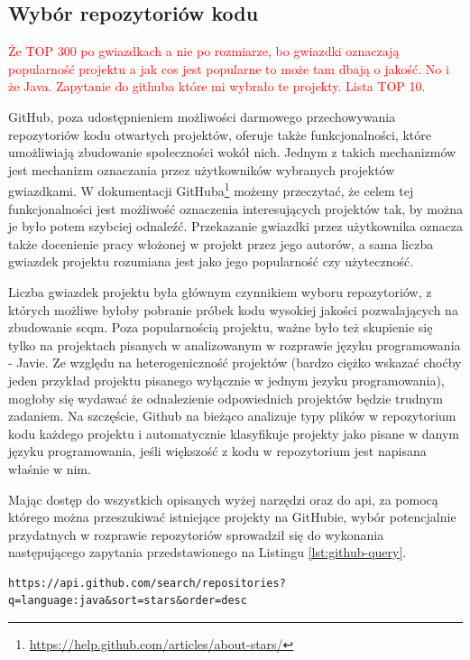 \documentclass[12pt]{report}
\begin{document}
\subsection{Wybór repozytoriów kodu}
\label{sec:impl:wybor-github}
\textcolor{red}{Że TOP 300 po gwiazdkach a nie po rozmiarze, bo gwiazdki oznaczają popularność projektu a jak cos jest popularne to może tam dbają o jakość. No i że Java. Zapytanie do githuba które mi wybrało te projekty. Lista TOP 10.}

GitHub, poza udostępnieniem możliwości darmowego przechowywania repozytoriów kodu otwartych projektów, oferuje także funkcjonalności, które umożliwiają zbudowanie społeczności wokół nich. Jednym z takich mechanizmów jest mechanizm oznaczania przez użytkowników wybranych projektów gwiazdkami. W dokumentacji GitHuba\footnote{\url{https://help.github.com/articles/about-stars/}} możemy przeczytać, że celem tej funkcjonalności jest możliwość oznaczenia interesujących projektów tak, by można je było potem szybciej odnaleźć. Przekazanie gwiazdki przez użytkownika oznacza także docenienie pracy włożonej w projekt przez jego autorów, a sama liczba gwiazdek projektu rozumiana jest jako jego popularność czy użyteczność.

Liczba gwiazdek projektu była głównym czynnikiem wyboru repozytoriów, z których możliwe byłoby pobranie próbek kodu wysokiej jakości pozwalających na zbudowanie \gls{scqm}. Poza popularnością projektu, ważne było też skupienie się tylko na projektach pisanych w analizowanym w rozprawie języku programowania - Javie. Ze względu na heterogeniczność projektów (bardzo ciężko wskazać choćby jeden przykład projektu pisanego wyłącznie w jednym jezyku programowania), mogłoby się wydawać że odnalezienie odpowiednich projektów będzie trudnym zadaniem. Na szczęście, Github na bieżąco analizuje typy plików w repozytorium kodu każdego projektu i automatycznie klasyfikuje projekty jako pisane w danym języku programowania, jeśli większość z kodu w repozytorium jest napisana właśnie w nim.

Mając dostęp do wszystkich opisanych wyżej narzędzi oraz do \gls{api}, za pomocą którego można przeszukiwać istniejące projekty na GitHubie, wybór potencjalnie przydatnych w rozprawie repozytoriów sprowadził się do wykonania następującego zapytania przedstawionego na Listingu \ref{lst:github-query}.

\begin{lstlisting}[frame=single,caption={Zapytanie do GitHub Search \gls{api} wybierające repozytoria kodu źródłowego do dalszej analizy},captionpos=b,label={lst:github-query}]
https://api.github.com/search/repositories?q=language:java&sort=stars&order=desc
\end{lstlisting}
\end{document}
